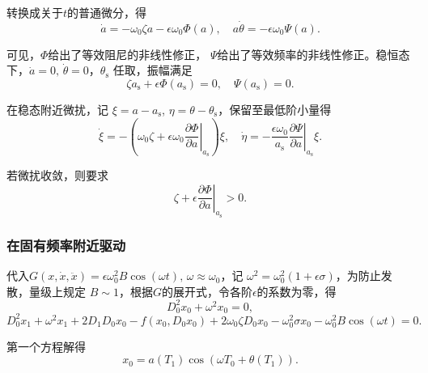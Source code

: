 转换成关于\(t\)的普通微分，得
\begin{equation*}
	\dot{a} = -\omega_0 \zeta a - \epsilon \omega_0 \Phi(a), \quad a \dot{\theta} = -\epsilon \omega_0 \Psi(a).
\end{equation*}

可见，\(\Phi\)给出了等效阻尼的非线性修正， \(\Psi\)给出了等效频率的非线性修正。稳恒态下，\(\dot{a} = 0,\,\dot{\theta} = 0\)，\(\theta_{\mathrm{s}}\) 任取，振幅满足
\begin{equation*}
	\zeta a_{\mathrm{s}} + \epsilon \Phi(a_{\mathrm{s}}) = 0, \quad \Psi(a_{\mathrm{s}}) = 0.
\end{equation*}

在稳态附近微扰，记  \(\xi = a - a_{\mathrm{s}}\), \(\eta = \theta - \theta_{\mathrm{s}}\)，保留至最低阶小量得
\begin{equation*}
	\dot{\xi} = -\left( \omega_0 \zeta + \epsilon \omega_0 \left. \dfrac{\partial \Phi}{\partial a} \right|_{a_{\mathrm{s}}} \right) \xi, \quad \dot{\eta} = -\dfrac{\epsilon \omega_0}{a_{\mathrm{s}}} \left. \dfrac{\partial \Psi}{\partial a} \right|_{a_{\mathrm{s}}} \xi.
\end{equation*}

若微扰收敛，则要求
\begin{equation*}
	\zeta + \epsilon \left. \dfrac{\partial \Phi}{\partial a} \right|_{a_{\mathrm{s}}} > 0.
\end{equation*}

\subsubsection{在固有频率附近驱动}

代入\(G (x, \dot{x}, \ddot{x}) = \epsilon \omega_0^2 B \cos(\omega t),\,\omega \approx \omega_0\)，记 \(\omega^2 = \omega_0^2 (1 + \epsilon \sigma)\)，为防止发散，量级上规定 \(B \sim 1\)，根据\(G\)的展开式，令各阶\(\epsilon\)的系数为零，得
\begin{equation*}
	D_0^2 x_0 + \omega^2 x_0 = 0,
\end{equation*}
\begin{equation*}
	D_0^2 x_1 + \omega^2 x_1 + 2 D_1 D_0 x_0 - f(x_0, D_0 x_0) + 2 \omega_0 \zeta D_0 x_0 - \omega_0^2 \sigma x_0 - \omega_0^2 B \cos(\omega t) = 0.
\end{equation*}

第一个方程解得
\begin{equation*}
	x_0 = a(T_1) \cos(\omega T_0 + \theta(T_1)).
\end{equation*}

